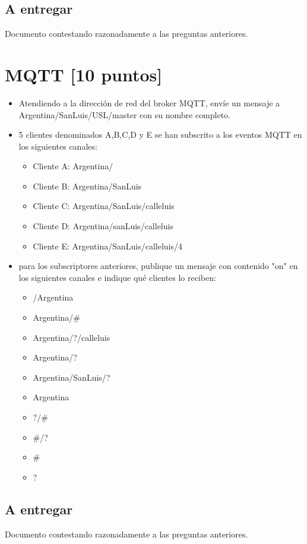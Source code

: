 \subsection{A entregar}
Documento contestando razonadamente a las preguntas anteriores.

\section{MQTT [10 puntos]}
\begin{itemize}
	\item Atendiendo a la dirección de red del broker MQTT, envíe un mensaje a Argentina/SanLuis/USL/master con su nombre completo.
	\item 5 clientes denominados A,B,C,D y E se han subscrito a los eventos MQTT en los siguientes canales:
	\begin{itemize}
		\item Cliente A: Argentina/
		\item Cliente B: Argentina/SanLuis
		\item Cliente C: Argentina/SanLuis/calleluis
		\item Cliente D: Argentina/sanLuis/calleluis
		\item Cliente E: Argentina/SanLuis/calleluis/4
	\end{itemize} 
	\item para los subscriptores anteriores, publique un mensaje con contenido "on" en los siguientes canales e indique qué clientes lo reciben:
	\begin{itemize}
		\item /Argentina
		\item Argentina/\#
		\item Argentina/?/calleluis
		\item Argentina/?
		\item Argentina/SanLuis/?
		\item Argentina
		\item ?/\#
		\item \#/?
		\item \#
		\item ?
	\end{itemize}
\end{itemize}
\subsection{A entregar}
Documento contestando razonadamente a las preguntas anteriores.

